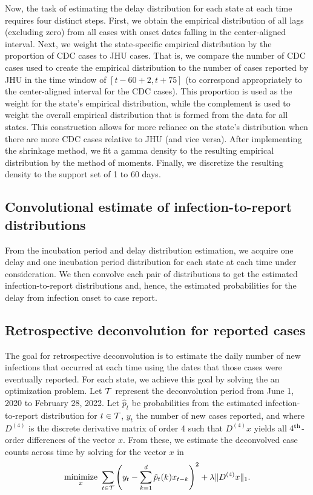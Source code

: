\documentclass{article}
\begin{document}
Now, the task of estimating the delay distribution for each state at each time
requires four distinct steps. First, we obtain the empirical
distribution of all lags (excluding zero) from all cases with onset dates
falling in the center-aligned interval. Next, we weight the state-specific
empirical distribution by the proportion of CDC cases to JHU cases. That is, we
compare the number of CDC cases used to create the empirical distribution to the
number of cases reported by JHU in the time window of $\left[t - 60 + 2, t +
75\right]$ (to correspond appropriately to the center-aligned interval for
the CDC cases). This proportion is used as the weight for the state's empirical
distribution, while the complement is used to weight the overall empirical
distribution that is formed from the data for all states. This construction
allows for more reliance on the state's distribution when there are more CDC
cases relative to JHU (and vice versa). After implementing the shrinkage method,
we fit a gamma density to the resulting empirical distribution by the method of
moments. Finally, we discretize the resulting density to the support set of 1
to 60 days.
 
\subsection{Convolutional estimate of infection-to-report distributions} 

From the incubation period and delay distribution estimation, we acquire one
delay and one incubation period distribution for each state at each time under
consideration. We then convolve each pair of distributions to get the estimated
infection-to-report distributions and, hence, the estimated probabilities for
the delay from infection onset to case report. 

\subsection{Retrospective deconvolution for reported cases}

The goal for retrospective deconvolution is to estimate the daily number of new
infections that occurred at each time using the dates that those cases were eventually
reported. For each state, we
achieve this goal by solving the an optimization problem. 
Let $\mathcal{T}$ represent the deconvolution period from June
1, 2020 to February 28, 2022. Let $\hat{p}_t$ be probabilities from the estimated
infection-to-report distribution for $t \in \mathcal{T}$, $y_t$ the number of new cases
reported, and where $D^{(4)}$ is the discrete derivative matrix of order 4
such that $D^{(4)}x$ yields all $4^{\textnormal{th}}$-order differences of the vector $x$. From these,
we estimate the deconvolved case counts across time by solving for the vector $x$ in
\begin{align*}
\operatorname*{minimize}_{x}\ \sum_{t \in \mathcal{T}} \left ( y_t -  \sum_{k = 1}^{d} \hat{p}_t(k)x_{t-k} 
\right )^2 + \lambda \|D^{(4)}x\|_1. 
\end{align*}
\end{document}
